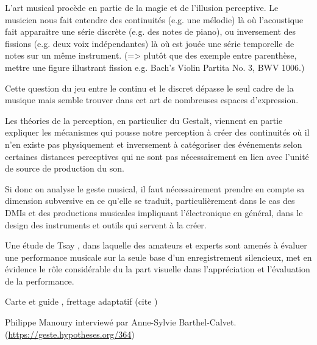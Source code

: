 L'art musical procède en partie de la magie et de l'illusion perceptive. Le musicien nous fait entendre des continuités (e.g. une mélodie) là où l'acoustique fait apparaitre une série discrète (e.g. des notes de piano), ou inversement des fissions (e.g. deux voix indépendantes) là où est jouée une série temporelle de notes sur un même instrument. (=> plutôt que des exemple entre parenthèse, mettre une figure illustrant fission e.g. Bach's Violin Partita No. 3, BWV 1006.)

Cette question du jeu entre le continu et le discret dépasse le seul cadre de la musique mais semble trouver dans cet art de nombreuses espaces d'expression.

Les théories de la perception, en particulier du Gestalt, viennent en partie expliquer les mécanismes qui pousse notre perception à créer des continuités où il n'en existe pas physiquement et inversement à catégoriser des événements selon certaines distances perceptives qui ne sont pas nécessairement en lien avec l'unité de source de production du son.

Si donc on analyse le geste musical, il faut nécessairement prendre en compte sa dimension subversive en ce qu'elle se traduit, particulièrement dans le cas des \glspl{DMI} et des productions musicales impliquant l'électronique en général, dans le design des instruments et outils qui servent à la créer.

\cite{bin_show_2018}

Une étude de Tsay \cite{tsay_sight_2013}, dans laquelle des amateurs et experts sont amenés à évaluer une performance musicale sur la seule base d'un enregistrement silencieux, met en évidence le rôle considérable du la part visuelle dans l'appréciation et l'évaluation de la performance.

Carte et guide , frettage adaptatif (cite \cite{goudard_playing_2014})


 Philippe Manoury interviewé par Anne-Sylvie Barthel-Calvet. (\url{https://geste.hypotheses.org/364})

